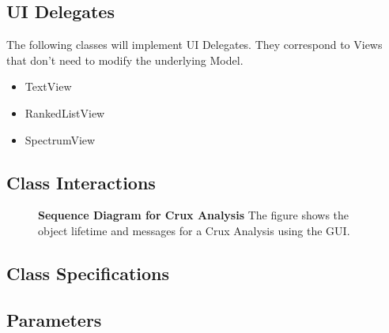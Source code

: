 \documentclass{article}
\begin{document}
\subsection{UI Delegates}

The following classes will implement UI Delegates. They correspond to Views
that don't need to modify the underlying Model.

\begin{itemize}
\item TextView 
\item RankedListView
\item SpectrumView
\end{itemize}

\subsection{Class Interactions}

\begin{figure}[h]
\centering
\caption{{\bf Sequence Diagram for Crux Analysis}  The figure shows the 
object lifetime and messages for a Crux Analysis using the GUI.
  \label{figure:sequence}}
\end{figure}

\subsection{Class Specifications}

\subsection{Parameters}
\end{document}
